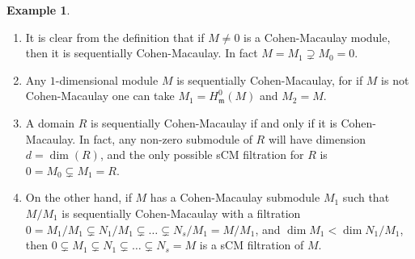 \documentclass[12pt]{amsart}
\theoremstyle{definition}
\theoremstyle{definition}
\newtheorem{example}[theorem]{Example}
\newcommand{\m}{\mathfrak{m}}
\begin{document}
\begin{example}\label{example sCM}
  \begin{enumerate}[(1)]
\item    It is clear from the definition that if $M \ne 0$ is a Cohen-Macaulay module, then it is sequentially Cohen-Macaulay. In fact $M=M_1\supsetneq M_0 = 0$.

\item  Any $1$-dimensional module $M$ is sequentially Cohen-Macaulay, for if $M$ is not Cohen-Macaulay one can take $M_1 = H^0_\m(M)$ and $M_2=M$.

\item  A domain  $R$  is  sequentially Cohen-Macaulay  if and only if it is Cohen-Macaulay. In fact, any non-zero submodule of $R$ will have dimension $d=\dim(R)$, and the only possible sCM filtration for $R$ is $0=M_0 \subsetneq M_1=R$.

\item On the other hand, if $M$ has a Cohen-Macaulay submodule $M_1$ such that $M/M_1$ is sequentially Cohen-Macaulay with a filtration $0=M_1/M_1 \subsetneq N_1/M_1  \subsetneq \ldots  \subsetneq N_s/M_1=M/M_1$, and $\dim M_1 < \dim N_1/M_1$, then $0\subsetneq M_1\subsetneq N_1\subsetneq\ldots\subsetneq  N_s=M$ is a sCM filtration of $M$.
  \end{enumerate}

\end{example}
  
\end{document}
